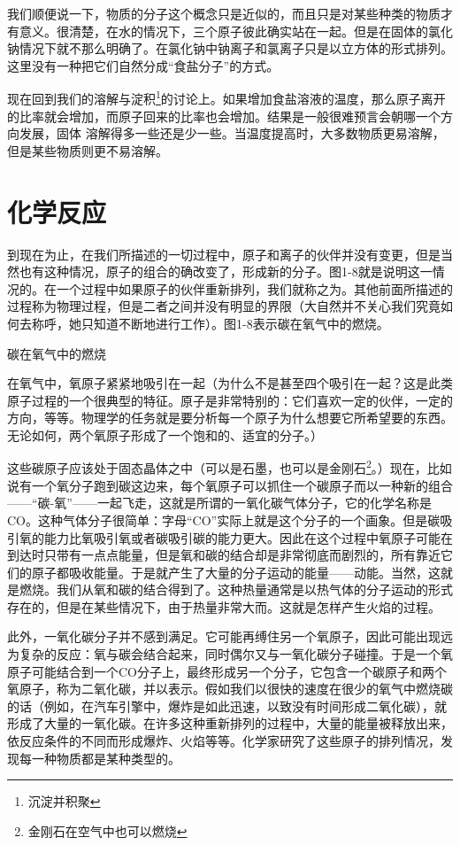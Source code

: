 \documentclass[12pt,oneside]{book}
\begin{document}
我们顺便说一下，物质的分子这个概念只是近似的，而且只是对某些种类的物质才有意义。很清楚，在水的情况下，三个原子彼此确实站在一起。但是在固体的氯化钠情况下就不那么明确了。在氯化钠中钠离子和氯离子只是以立方体的形式排列。这里没有一种把它们自然分成“食盐分子”的方式。

现在回到我们的溶解与淀积\footnote{沉淀并积聚}的讨论上。如果增加食盐溶液的温度，那么原子离开的比率就会增加，而原子回来的比率也会增加。结果是一般很难预言会朝哪一个方向发展，固体
溶解得多一些还是少一些。当温度提高时，大多数物质更易溶解， 但是某些物质则更不易溶解。

\section{化学反应}
到现在为止，在我们所描述的一切过程中，原子和离子的伙伴并没有变更，但是当然也有这种情况，原子的组合的确改变了，形成新的分子。图1-8就是说明这一情况的。在一个过程中如果原子的伙伴重新排列，我们就称之为。其他前面所描述的过程称为物理过程，但是二者之间并没有明显的界限（大自然并不关心我们究竟如何去称呼，她只知道不断地进行工作）。图1-8表示碳在氧气中的燃烧。
\begin{fig}{碳在氧气中的燃烧}
\caption{碳在氧气中的燃烧}
\label{fig:碳在氧气中的燃烧}
\end{fig}
在氧气中，氧原子紧紧地吸引在一起（为什么不是甚至四个吸引在一起？这是此类原子过程的一个很典型的特征。原子是非常特别的：它们喜欢一定的伙伴，一定的方向，等等。物理学的任务就是要分析每一个原子为什么想要它所希望要的东西。无论如何，两个氧原子形成了一个饱和的、适宜的分子。）

这些碳原子应该处于固态晶体之中（可以是石墨，也可以是金刚石\footnote{金刚石在空气中也可以燃烧}。）现在，比如说有一个氧分子跑到碳这边来，每个氧原子可以抓住一个碳原子而以一种新的组合——“碳-氧”——一起飞走，这就是所谓的一氧化碳气体分子，它的化学名称是CO。这种气体分子很简单：字母“CO”实际上就是这个分子的一个画象。但是碳吸引氧的能力比氧吸引氧或者碳吸引碳的能力更大。因此在这个过程中氧原子可能在到达时只带有一点点能量，但是氧和碳的结合却是非常彻底而剧烈的，所有靠近它们的原子都吸收能量。于是就产生了大量的分子运动的能量——动能。当然，这就是燃烧。我们从氧和碳的结合得到了。这种热量通常是以热气体的分子运动的形式存在的，但是在某些情况下，由于热量非常大而。这就是怎样产生火焰的过程。

此外，一氧化碳分子并不感到满足。它可能再缚住另一个氧原子，因此可能出现远为复杂的反应：氧与碳会结合起来，同时偶尔又与一氧化碳分子碰撞。于是一个氧原子可能结合到一个CO分子上，最终形成另一个分子，它包含一个碳原子和两个氧原子，称为二氧化碳，并以表示。假如我们以很快的速度在很少的氧气中燃烧碳的话（例如，在汽车引擎中，爆炸是如此迅速，以致没有时间形成二氧化碳），就形成了大量的一氧化碳。在许多这种重新排列的过程中，大量的能量被释放出来，依反应条件的不同而形成爆炸、火焰等等。化学家研究了这些原子的排列情况，发现每一种物质都是某种类型的。
\end{document}
